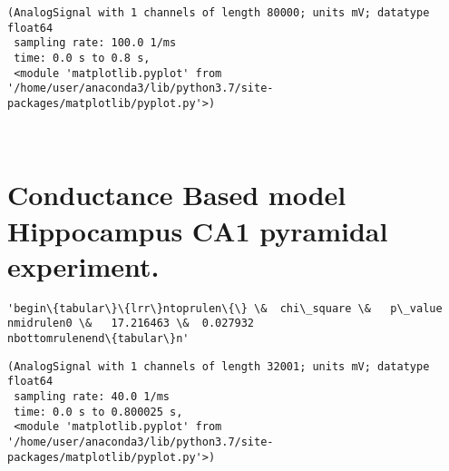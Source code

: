             \begin{tcolorbox}[breakable, size=fbox, boxrule=.5pt, pad at break*=1mm, opacityfill=0]
\begin{Verbatim}[commandchars=\\\{\}]
(AnalogSignal with 1 channels of length 80000; units mV; datatype float64
 sampling rate: 100.0 1/ms
 time: 0.0 s to 0.8 s,
 <module 'matplotlib.pyplot' from '/home/user/anaconda3/lib/python3.7/site-
packages/matplotlib/pyplot.py'>)
\end{Verbatim}
\end{tcolorbox}
        
    \begin{center}
    \end{center}
    { \hspace*{\fill} \\}
    
    \hypertarget{conductance-based-model-hippocampus-ca1-pyramidal-experiment.}{%
\section{Conductance Based model Hippocampus CA1 pyramidal
experiment.}\label{conductance-based-model-hippocampus-ca1-pyramidal-experiment.}}

            \begin{tcolorbox}[breakable, size=fbox, boxrule=.5pt, pad at break*=1mm, opacityfill=0]
\begin{Verbatim}[commandchars=\\\{\}]
'begin\{tabular\}\{lrr\}ntoprulen\{\} \&  chi\_square \&   p\_value
nmidrulen0 \&   17.216463 \&  0.027932
nbottomrulenend\{tabular\}n'
\end{Verbatim}
\end{tcolorbox}
        
    

            \begin{tcolorbox}[breakable, size=fbox, boxrule=.5pt, pad at break*=1mm, opacityfill=0]
\begin{Verbatim}[commandchars=\\\{\}]
(AnalogSignal with 1 channels of length 32001; units mV; datatype float64
 sampling rate: 40.0 1/ms
 time: 0.0 s to 0.800025 s,
 <module 'matplotlib.pyplot' from '/home/user/anaconda3/lib/python3.7/site-
packages/matplotlib/pyplot.py'>)
\end{Verbatim}
\end{tcolorbox}
        
